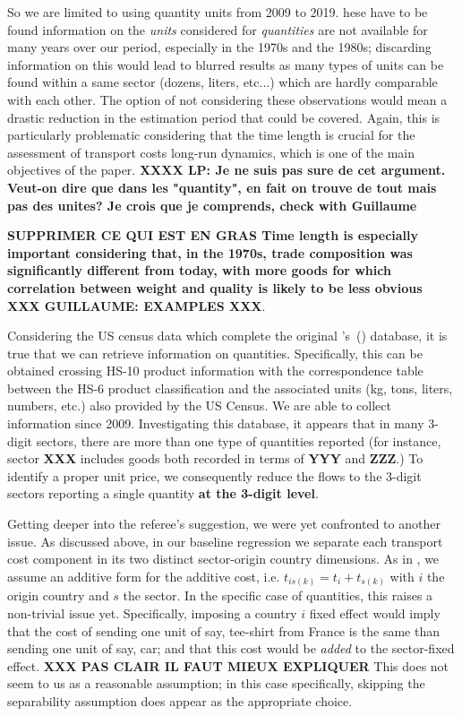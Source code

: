 \documentclass[a4paper,11pt]{article}
\newcommand\cites[1]{\citeauthor{#1}'s\ (\citeyear{#1})}
\begin{document}
\begin{itemize}
\begin{enumerate}
\begin{table}[htbp]
So we are limited to using quantity units from 2009 to 2019.
hese have to be found information on the \textit{units} considered for \textit{quantities} are not available for many years over our period, especially in the 1970s and the 1980s; discarding information on this would lead to blurred results as many types of units can be found within a same sector (dozens, liters, etc...) which are hardly comparable with each other. The option of not considering these observations would mean a drastic reduction in the estimation period that could be covered. Again, this is particularly problematic considering that the time length is crucial for the assessment of transport costs long-run dynamics, which is one of the main objectives of the paper. \textbf{XXXX LP: Je ne suis pas sure de cet argument. Veut-on dire que dans les "quantity", en fait on trouve de tout mais pas des unites? Je crois que je comprends, check with Guillaume }

\textbf{SUPPRIMER CE QUI EST EN GRAS Time length is especially important considering that, in the 1970s, trade composition was significantly different from today, with more goods for which correlation between weight and quality is likely to be less obvious} \textbf{XXX GUILLAUME: EXAMPLES XXX}.


Considering the US census data which complete the original \cites{hummels2007} database, it is true that we can retrieve information on quantities. Specifically, this can be obtained crossing HS-10 product information with the correspondence table between the HS-6 product classification and the associated units (kg, tons, liters, numbers, etc.) also provided by the US Census. We are able to collect information since 2009. Investigating this database, it appears that in many 3-digit sectors, there are more than one type of quantities reported (for instance, sector \textbf{XXX} includes goods both recorded in terms of \textbf{YYY} and \textbf{ZZZ}.) To identify a proper unit price, we consequently reduce the flows to the 3-digit sectors reporting a single quantity \textbf{at the 3-digit level}.


Getting deeper into the referee's suggestion, we were yet confronted to another issue. As discussed above, in our baseline regression we separate each transport cost component in its two distinct sector-origin country dimensions. As in \cite{Irrazabal_2015}, we assume an additive form for the additive cost, i.e. $t_{is(k)} = t_i+t_{s(k)}$ with $i$ the origin country and $s$ the sector. In the specific case of quantities, this raises a non-trivial issue yet. Specifically, imposing a country $i$ fixed effect would imply that the cost of sending one unit of say, tee-shirt from France is the same than sending one unit of say, car; and that this cost would be \textit{added} to the sector-fixed effect. \textbf{XXX PAS CLAIR IL FAUT MIEUX EXPLIQUER } This does not seem to us as a reasonable assumption; in this case specifically, skipping the separability assumption does appear as the appropriate choice.


\end{table}
\end{enumerate}
\end{itemize}
\end{document}
